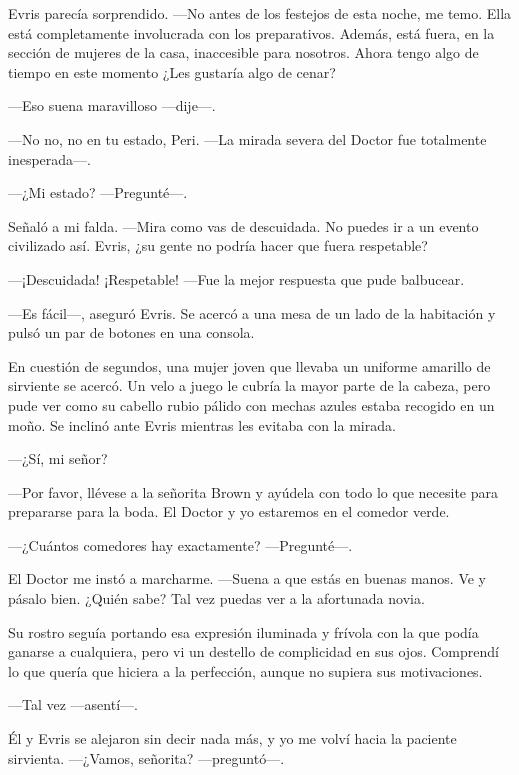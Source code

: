 Evris parecía sorprendido. ---No antes de los festejos de esta noche, me
temo. Ella está completamente involucrada con los preparativos. Además,
está fuera, en la sección de mujeres de la casa, inaccesible para
nosotros. Ahora tengo algo de tiempo en este momento ¿Les gustaría algo
de cenar?

---Eso suena maravilloso ---dije---.

---No no, no en tu estado, Peri. ---La mirada severa del Doctor fue
totalmente inesperada---.

---¿Mi estado? ---Pregunté---.

Señaló a mi falda. ---Mira como vas de descuidada. No puedes ir a un
evento civilizado así. Evris, ¿su gente no podría hacer que fuera
respetable?

---¡Descuidada! ¡Respetable! ---Fue la mejor respuesta que pude
balbucear.

---Es fácil---, aseguró Evris. Se acercó a una mesa de un lado de la
habitación y pulsó un par de botones en una consola.

En cuestión de segundos, una mujer joven que llevaba un uniforme
amarillo de sirviente se acercó. Un velo a juego le cubría la mayor
parte de la cabeza, pero pude ver como su cabello rubio pálido con
mechas azules estaba recogido en un moño. Se inclinó ante Evris mientras
les evitaba con la mirada.

---¿Sí, mi señor?

---Por favor, llévese a la señorita Brown y ayúdela con todo lo que
necesite para prepararse para la boda. El Doctor y yo estaremos en el
comedor verde.

---¿Cuántos comedores hay exactamente? ---Pregunté---.

El Doctor me instó a marcharme. ---Suena a que estás en buenas manos. Ve
y pásalo bien. ¿Quién sabe? Tal vez puedas ver a la afortunada novia.

Su rostro seguía portando esa expresión iluminada y frívola con la que
podía ganarse a cualquiera, pero vi un destello de complicidad en sus
ojos. Comprendí lo que quería que hiciera a la perfección, aunque no
supiera sus motivaciones.

---Tal vez ---asentí---.

Él y Evris se alejaron sin decir nada más, y yo me volví hacia la
paciente sirvienta. ---¿Vamos, señorita? ---preguntó---.